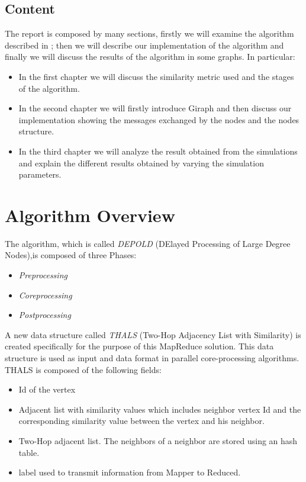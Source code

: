\documentclass[12pt]{article}
\begin{document}
\subsection{Content}
The report is composed by many sections, firstly we will examine the algorithm described in \cite{6517336}; then we will describe our implementation of the algorithm and finally we will discuss the results of the algorithm in some graphs. In particular:
\begin{itemize}
    \item In the first chapter we will discuss the similarity metric used and the stages of the algorithm.
    \item In the second chapter we will firstly introduce Giraph and then discuss our implementation showing the messages exchanged by the nodes and the nodes structure.
    \item In the third chapter we will analyze the result obtained from the simulations and explain the different results obtained by varying the simulation parameters.
\end{itemize}

\section{Algorithm Overview}
The algorithm, which is called \emph{DEPOLD} (DElayed Processing of Large Degree Nodes),is composed of three Phases:
\begin{itemize}
    \item \emph{Preprocessing}
    \item \emph{Coreprocessing}
    \item \emph{Postprocessing}
\end{itemize}
        A new data structure called \emph{THALS} (Two-Hop Adjacency List with Similarity) is created specifically for the purpose of this MapReduce solution. This data structure is used as input and data format in parallel core-processing algorithms.
THALS is composed of the following fields:
\begin{itemize}
    \item Id of the vertex
    \item Adjacent list with similarity values which includes neighbor vertex Id and the corresponding similarity value between the vertex and his neighbor.
    \item Two-Hop adjacent list. The neighbors of a neighbor are stored using an hash table.
    \item label used to transmit information from Mapper to Reduced.
\end{itemize}
\end{document}
